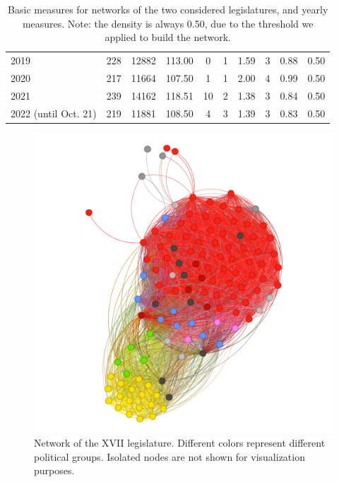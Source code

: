 \begin{table}[ht]
\begin{tabular}{lccccccccc}
   2019 &      228 &    12882 &       113.00 &              0 &               1 &      1.59 &          3 &     0.88 &      0.50 \\


    2020 &      217 &    11664 &       107.50 &              1 &               1 &      2.00 &          4 &     0.99 &      0.50 \\

   2021 &      239 &    14162 &       118.51 &             10 &               2 &      1.38 &          3 &     0.84 &      0.50 \\

   2022 (until Oct. 21) &      219 &    11881 &       108.50 &              4 &               3 &      1.39 &          3 &     0.83 &      0.50 
\\

\hline

\end{tabular}
\caption{Basic measures for networks of the two considered legislatures, and yearly measures. Note: the density is always 0.50, due to the threshold we applied to build the network.}
\label{tab:basic_measures}

\end{table}


\begin{figure}[h]
  \centering
  \includegraphics[width=\linewidth]{img/xvii_graph.png}
  \caption{Network of the XVII legislature. Different colors represent different political groups. Isolated nodes are not shown for visualization purposes.}
  \label{fig:graph}
\end{figure}



